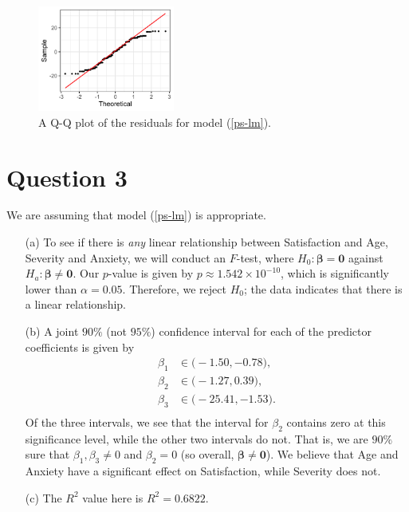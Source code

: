 \documentclass[10pt]{article}
\begin{document}
\begin{itemize}
    \begin{figure}
        \centering
        \includegraphics[width = 0.4\textwidth]{img/ps-qqnorm.png}
        \caption{A Q-Q plot of the residuals for model (\ref{ps-lm}).}
        \label{ps-qqplot}
    \end{figure}
\end{itemize}

\section{Question 3} \noindent
We are assuming that model (\ref{ps-lm}) is appropriate. 
\begin{itemize}
    \item[(a)] To see if there is \textsl{any} linear relationship between Satisfaction and Age, Severity and Anxiety, we will conduct an \(F\)-test, where 
    \(H_0 : \bm{\beta} = \mathbf{0}\) against \(H_a : \bm{\beta} \neq \mathbf{0}\). Our \(p\)-value is given by 
    \(p \approx 1.542 \times 10^{-10}\), which is significantly lower than \(\alpha = 0.05\). Therefore, we reject \(H_0\); the data indicates that 
    there is a linear relationship. 
    \item[(b)] A joint \(90\%{}\) (not \(95\%{}\)) confidence interval for each of the predictor coefficients is given by 
    \begin{align*}
        \beta_1 &\in \Big( -1.50 , -0.78 \Big), \\
        \beta_2 &\in \Big( -1.27 ,  0.39 \Big), \\
        \beta_3 &\in \Big( -25.41 , -1.53 \Big). \\
    \end{align*}
    Of the three intervals, we see that the interval for \(\beta_2\) contains zero at this significance level, while the other two intervals do not. That is,
    we are \(90\%{}\) sure that \(\beta_1, \beta_3 \neq 0\) and \(\beta_2 = 0\) (so overall, \(\bm{\beta} \neq \mathbf{0}\)). We believe that 
    Age and Anxiety have a significant effect on Satisfaction, while Severity does not. 
    \item[(c)] The \(R^2\) value here is \(R^2 = 0.6822\). 
\end{itemize}
\end{document}
